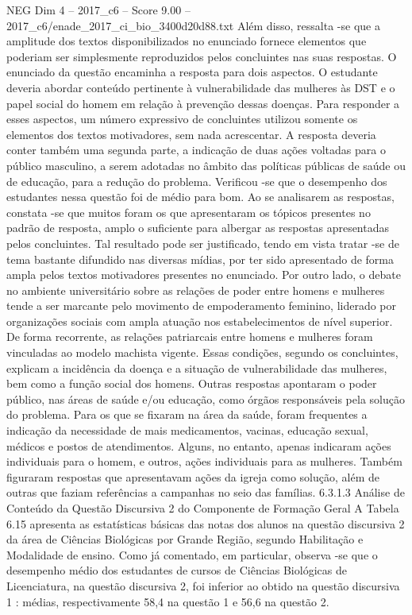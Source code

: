 \begin{textsample}{NEG Dim 4 – 2017\_c6 – Score 9.00 – 2017\_c6/enade\_2017\_ci\_bio\_3400d20d88.txt}
Além disso, ressalta -se que a amplitude dos textos disponibilizados no enunciado fornece elementos que poderiam ser simplesmente reproduzidos pelos concluintes nas suas respostas.
O enunciado da questão encaminha a resposta para dois aspectos.
O estudante deveria abordar conteúdo pertinente à vulnerabilidade das mulheres às DST e o papel social do homem em relação à prevenção dessas doenças.
Para responder a esses aspectos, um número expressivo de concluintes utilizou somente os elementos dos textos motivadores, sem nada acrescentar.
A resposta deveria conter também uma segunda parte, a indicação de duas ações voltadas para o público masculino, a serem adotadas no âmbito das políticas públicas de saúde ou de educação, para a redução do problema.
Verificou -se que o desempenho dos estudantes nessa questão foi de médio para bom.
Ao se analisarem as respostas, constata -se que muitos foram os que apresentaram os tópicos presentes no padrão de resposta, amplo o suficiente para albergar as respostas apresentadas pelos concluintes.
Tal resultado pode ser justificado, tendo em vista tratar -se de tema bastante difundido nas diversas mídias, por ter sido apresentado de forma ampla pelos textos motivadores presentes no enunciado.
Por outro lado, o debate no ambiente universitário sobre as relações de poder entre homens e mulheres tende a ser marcante pelo movimento de empoderamento feminino, liderado por organizações sociais com ampla atuação nos estabelecimentos de nível superior.
De forma recorrente, as relações patriarcais entre homens e mulheres foram vinculadas ao modelo machista vigente.
Essas condições, segundo os concluintes, explicam a incidência da doença e a situação de vulnerabilidade das mulheres, bem como a função social dos homens.
Outras respostas apontaram o poder público, nas áreas de saúde e/ou educação, como órgãos responsáveis pela solução do problema.
Para os que se fixaram na área da saúde, foram frequentes a indicação da necessidade de mais medicamentos, vacinas, educação sexual, médicos e postos de atendimentos.
Alguns, no entanto, apenas indicaram ações individuais para o homem, e outros, ações individuais para as mulheres.
Também figuraram respostas que apresentavam ações da igreja como solução, além de outras que faziam referências a campanhas no seio das famílias. 6.3.1.3 Análise de Conteúdo da Questão Discursiva 2 do Componente de Formação Geral A Tabela 6.15 apresenta as estatísticas básicas das notas dos alunos na questão discursiva 2 da área de Ciências Biológicas por Grande Região, segundo Habilitação e Modalidade de ensino.
Como já comentado, em particular, observa -se que o desempenho médio dos estudantes de cursos de Ciências Biológicas de Licenciatura, na questão discursiva 2, foi inferior ao obtido na questão discursiva 1 : médias, respectivamente 58,4 na questão 1 e 56,6 na questão 2.

\end{textsample}
